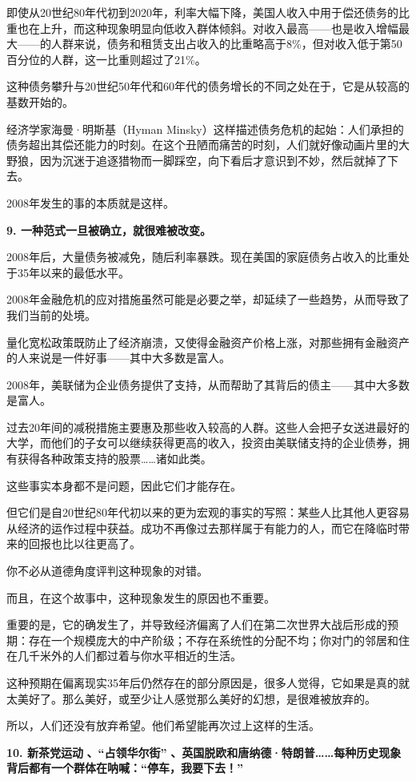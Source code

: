 即使从20世纪80年代初到2020年，利率大幅下降，美国人收入中用于偿还债务的比重也在上升，而这种现象明显向低收入群体倾斜。对收入最高——也是收入增幅最大——的人群来说，债务和租赁支出占收入的比重略高于8\%，但对收入低于第50百分位的人群，这一比重则超过了21\%。

这种债务攀升与20世纪50年代和60年代的债务增长的不同之处在于，它是从较高的基数开始的。

经济学家海曼·明斯基（Hyman Minsky）这样描述债务危机的起始：人们承担的债务超出其偿还能力的时刻。在这个丑陋而痛苦的时刻，人们就好像动画片里的大野狼，因为沉迷于追逐猎物而一脚踩空，向下看后才意识到不妙，然后就掉了下去。

2008年发生的事的本质就是这样。

\textbf{9. 一种范式一旦被确立，就很难被改变。}

2008年后，大量债务被减免，随后利率暴跌。现在美国的家庭债务占收入的比重处于35年以来的最低水平。

2008年金融危机的应对措施虽然可能是必要之举，却延续了一些趋势，从而导致了我们当前的处境。

量化宽松政策既防止了经济崩溃，又使得金融资产价格上涨，对那些拥有金融资产的人来说是一件好事——其中大多数是富人。

2008年，美联储为企业债务提供了支持，从而帮助了其背后的债主——其中大多数是富人。

过去20年间的减税措施主要惠及那些收入较高的人群。这些人会把子女送进最好的大学，而他们的子女可以继续获得更高的收入，投资由美联储支持的企业债券，拥有获得各种政策支持的股票……诸如此类。

这些事实本身都不是问题，因此它们才能存在。

但它们是自20世纪80年代初以来的更为宏观的事实的写照：某些人比其他人更容易从经济的运作过程中获益。成功不再像过去那样属于有能力的人，而它在降临时带来的回报也比以往更高了。

你不必从道德角度评判这种现象的对错。

而且，在这个故事中，这种现象发生的原因也不重要。

重要的是，它的确发生了，并导致经济偏离了人们在第二次世界大战后形成的预期：存在一个规模庞大的中产阶级；不存在系统性的分配不均；你对门的邻居和住在几千米外的人们都过着与你水平相近的生活。

这种预期在偏离现实35年后仍然存在的部分原因是，很多人觉得，它如果是真的就太美好了。那么美好，或至少让人感觉那么美好的幻想，是很难被放弃的。

所以，人们还没有放弃希望。他们希望能再次过上这样的生活。

\textbf{10. 新茶党运动 }\footnotemark\textbf{、“占领华尔街” }\footnotemark\textbf{、英国脱欧和唐纳德·特朗普……每种历史现象背后都有一个群体在呐喊：“停车，我要下去！”}

